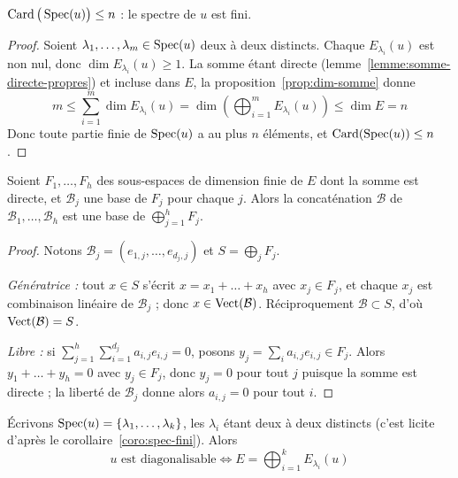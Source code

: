 \documentclass[11pt]{article}
\begin{document}
\begin{coro}
\label{coro:spec-fini}
$\operatorname{Card}\big(\operatorname{Spec}(u)\big)\leq n$ : le spectre de $u$ est fini.
\end{coro}

\begin{proof}
Soient $\lambda_1,\dots,\lambda_m\in\operatorname{Spec}(u)$ deux à deux distincts. Chaque $E_{\lambda_i}(u)$ est non nul, donc $\dim E_{\lambda_i}(u)\geq 1$. La somme étant directe (lemme~\ref{lemme:somme-directe-propres}) et incluse dans $E$, la proposition~\ref{prop:dim-somme} donne
\[m \leq \sum_{i=1}^{m}\dim E_{\lambda_i}(u) = \dim\left(\bigoplus_{i=1}^{m}E_{\lambda_i}(u)\right) \leq \dim E = n\]
Donc toute partie finie de $\operatorname{Spec}(u)$ a au plus $n$ éléments, et $\operatorname{Card}(\operatorname{Spec}(u))\leq n$.
\end{proof}

\begin{lemme}
\label{lemme:base-adaptee}
Soient $F_1,\dots,F_h$ des sous-espaces de dimension finie de $E$ dont la somme est directe, et $\mathcal{B}_j$ une base de $F_j$ pour chaque $j$. Alors la concaténation $\mathcal{B}$ de $\mathcal{B}_1,\dots,\mathcal{B}_h$ est une base de $\bigoplus_{j=1}^{h}F_j$.
\end{lemme}

\begin{proof}
Notons $\mathcal{B}_j=(e_{1,j},\dots,e_{d_j,j})$ et $S=\bigoplus_j F_j$.

\emph{Génératrice :} tout $x\in S$ s'écrit $x=x_1+\dots+x_h$ avec $x_j\in F_j$, et chaque $x_j$ est combinaison linéaire de $\mathcal{B}_j$ ; donc $x\in\operatorname{Vect}(\mathcal{B})$. Réciproquement $\mathcal{B}\subset S$, d'où $\operatorname{Vect}(\mathcal{B})=S$.

\emph{Libre :} si $\sum_{j=1}^{h}\sum_{i=1}^{d_j}a_{i,j}e_{i,j}=0$, posons $y_j=\sum_{i}a_{i,j}e_{i,j}\in F_j$. Alors $y_1+\dots+y_h=0$ avec $y_j\in F_j$, donc $y_j=0$ pour tout $j$ puisque la somme est directe ; la liberté de $\mathcal{B}_j$ donne alors $a_{i,j}=0$ pour tout $i$.
\end{proof}

\begin{theo}
\label{theo:diago-somme-directe}
Écrivons $\operatorname{Spec}(u)=\{\lambda_1,\dots,\lambda_k\}$, les $\lambda_i$ étant deux à deux distincts (c'est licite d'après le corollaire~\ref{coro:spec-fini}). Alors
\[u \text{ est diagonalisable} \iff E=\bigoplus_{i=1}^{k}E_{\lambda_i}(u)\]
\end{theo}
\end{document}

